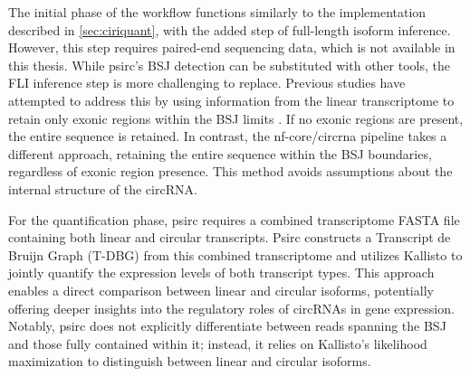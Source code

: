 The initial phase of the workflow functions similarly to the implementation
described in \cref{sec:ciriquant}, with the added step of full-length isoform
inference.
However, this step requires paired-end sequencing data, which is not available
in this thesis.
While psirc's BSJ detection can be substituted with other tools, the FLI
inference step is more challenging to replace.
Previous studies have attempted to address this by using information from the
linear transcriptome to retain only exonic regions within the BSJ limits
\supercite{hoffmann_circrna-sponging_2023}.
If no exonic regions are present, the entire sequence is retained.
In contrast, the nf-core/circrna pipeline takes a different approach, retaining
the entire sequence within the BSJ boundaries, regardless of exonic region
presence.
This method avoids assumptions about the internal structure of the circRNA.

For the quantification phase, psirc requires a combined transcriptome FASTA
file containing both linear and circular transcripts.
Psirc constructs a Transcript de Bruijn Graph (T-DBG) from this combined
transcriptome and utilizes Kallisto to jointly quantify the expression levels
of both transcript types\supercite{yu_quantifying_2021}.
This approach enables a direct comparison between linear and circular isoforms,
potentially offering deeper insights into the regulatory roles of circRNAs in
gene expression.
Notably, psirc does not explicitly differentiate between reads spanning the BSJ
and those fully contained within it; instead, it relies on Kallisto's
likelihood maximization to distinguish between linear and circular
isoforms\supercite{yu_quantifying_2021}.
